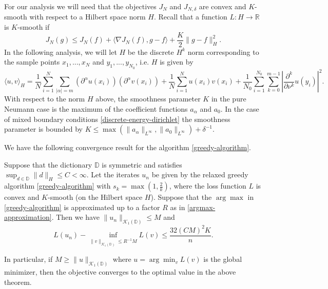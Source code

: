 For our analysis we will need that the objectives $J_N$ and $J_{N,\delta}$ are convex and $K$-smooth with respect to a Hilbert space norm $H$. Recall that a function $L:H\rightarrow \mathbb{R}$ is $K$-smooth if 
\begin{equation}
 J_N(g) \leq J_N(f) + \langle\nabla J_N(f), g-f\rangle + \frac{K}{2}\|g-f\|_H^2.
\end{equation}
In the following analysis, we will let $H$ be the discrete $H^k$ norm corresponding to the sample points $x_1,...,x_N$ and $y_1,...,y_{N_0}$, i.e. $H$ is given by
\begin{equation}\label{discrete-hm-inner-product}
 \langle u,v\rangle_H = \frac{1}{N}\sum_{i=1}^N\sum_{|\alpha| = m}(\partial^\alpha u(x_i))(\partial^\alpha v(x_i)) + \frac{1}{N}\sum_{i=1}^N u(x_i)v(x_i) + \frac{1}{N_0}\sum_{i=1}^{N_0} \sum_{k=0}^{m-1} \left|\frac{\partial^k}{\partial \nu^k}u(y_i)\right|^2.
\end{equation}
With respect to the norm $H$ above, the smoothness parameter $K$ in the pure Neumann case is the maximum of the coefficient functions $a_\alpha$ and $a_0$. In the case of mixed boundary conditions \eqref{discrete-energy-dirichlet} the smoothness parameter is bounded by $K \leq \max(\|a_{\alpha}\|_{L^\infty}, \|a_{0}\|_{L^\infty}) + \delta^{-1}$. 

We have the following convergence result for the algorithm \eqref{greedy-algorithm}.
\begin{theorem}\label{relaxed-boosting-theorem}
 Suppose that the dictionary $\mathbb{D}$ is symmetric and satisfies $\sup_{d\in \mathbb{D}}\|d\|_H \leq C < \infty$. Let the iterates $u_n$ be given by the relaxed greedy algorithm \eqref{greedy-algorithm} with $s_k = \max\left(1,\frac{2}{k}\right)$, where the loss function $L$ is convex and $K$-smooth (on the Hilbert space $H$). Suppose that the $\arg\max$ in \eqref{greedy-algorithm} is approximated up to a factor $R$ as in \eqref{argmax-approximation}. Then we have $\|u_n\|_{\mathcal{K}_1(\mathbb{D})} \leq M$ and 
 \begin{equation}
  L(u_n) - \inf_{\|v\|_{\mathcal{K}_1(\mathbb{D})} \leq R^{-1}M} L(v) \leq \frac{32(CM)^2K}{n}.
 \end{equation}

\end{theorem}
In particular, if $M \geq \|u\|_{\mathcal{K}_1(\mathbb{D})}$ where $u = \arg\min_v L(v)$ is the global minimizer, then the objective converges to the optimal value in the above theorem. 

